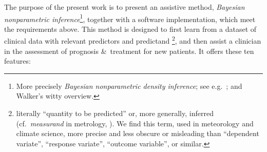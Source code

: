 \documentclass[a4paper,12pt,%
onecolumn,oneside,article,%
british%
]{memoir}
\theoremstyle{remark}
\theoremstyle{innote}
\newcommand*{\citey}{\cites*}
\newcommand*{\amp}{\&}
\renewcommand*{\|}[1][]{\nonscript\:#1\vert\nonscript\:\mathopen{}}
\newcommand*{\eg}{{e.g.}}
\newcommand*{\cf}{{cf.}}
\begin{document}
\medskip

The purpose of the present work is to present an assistive method, \emph{Bayesian nonparametric inference}\footnote{More precisely \emph{Bayesian nonparametric density inference}; see \eg\ \cites{rodriguezetal2009,bhattacharyaetal2010}; and Walker's \citey{walker2010} witty overview.}, together with a software implementation, which meet the requirements above. This method is designed to first learn from a dataset of clinical data with relevant predictors and predictand%
%
%
\footnote{literally \enquote{quantity to be predicted} or, more generally, inferred (\cf\ \emph{measurand} in metrology, \cites[2.3]{jcgm1997_r2012}). We find this term, used in meteorology and climate science, more precise and less obscure or misleading than \enquote{dependent variate}, \enquote{response variate}, \enquote{outcome variable}, or similar.}, and then assist a clinician in the assessment of prognosis \amp\ treatment for new patients. It offers these ten features:
\end{document}
